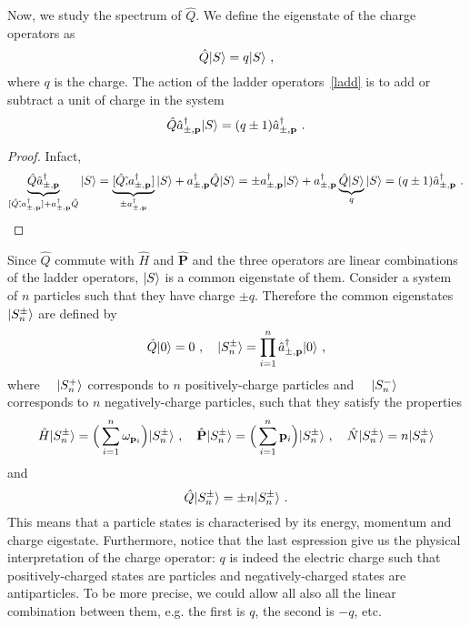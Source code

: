     Now, we study the spectrum of $\hat Q$. We define the eigenstate of the charge operators as 
    \begin{equation*}
        \hat Q \vert S\rangle = q \vert S\rangle ~,
    \end{equation*}
    where $q$ is the charge. The action of the ladder operators~\eqref{ladd} is to add or subtract a unit of charge in the system
    \begin{equation*}
        \hat Q \hat a_{\pm, \mathbf p}^\dagger \vert S\rangle = (q \pm 1) \hat a_{\pm, \mathbf p}^\dagger ~.
    \end{equation*}
    \begin{proof}
        Infact, 
        \begin{equation*}
            \underbrace{\hat Q \hat a_{\pm, \mathbf p}^\dagger}_{[\hat Q \hat,  a_{\pm, \mathbf p}^\dagger] + a_{\pm, \mathbf p}^\dagger \hat Q } \vert S\rangle = \underbrace{[\hat Q \hat,  a_{\pm, \mathbf p}^\dagger]}_{\pm a_{\pm, \mathbf p}^\dagger} \vert S\rangle + a_{\pm, \mathbf p}^\dagger \hat Q \vert S\rangle = \pm a_{\pm, \mathbf p}^\dagger \vert S\rangle + a_{\pm, \mathbf p}^\dagger \underbrace{\hat Q \vert S\rangle}_{q }\vert S\rangle = (q \pm 1) \hat a_{\pm, \mathbf p}^\dagger ~.
        \end{equation*}
    \end{proof}

    Since $\hat Q$ commute with $\hat H$ and $\hat{\mathbf P}$ and the three operators are linear combinations of the ladder operators, $\vert S\rangle$ is a common eigenstate of them. Consider a system of $n$ particles such that they have charge $\pm q$. Therefore the common eigenstates $\vert S_n^\pm\rangle$ are defined by 
    \begin{equation*}
        \hat Q \vert0\rangle = 0 ~, \quad \vert S_n^\pm\rangle = \prod_{i=1}^n \hat a_{\pm, \mathbf p}^\dagger \vert0\rangle ~,
    \end{equation*}
    where $\quad \vert S_n^+\rangle$ corresponds to $n$ positively-charge particles and $\quad \vert S_n^-\rangle$ corresponds to $n$ negatively-charge particles, such that they satisfy the properties
    \begin{equation*}
        \hat H \vert S_n^\pm\rangle = \Big (\sum_{i = 1}^{n} \omega_{\mathbf p_i} \Big ) \vert S_n^\pm\rangle ~, \quad \hat{\mathbf P} \vert S_n^\pm\rangle = \Big (\sum_{i = 1}^{n} \mathbf p_i \Big ) \vert S_n^\pm\rangle ~, \quad \hat N \vert S_n^\pm\rangle = n \vert S_n^\pm\rangle
    \end{equation*}
    and 
    \begin{equation*}
        \hat Q \vert S_n^\pm\rangle = \pm n \vert S_n^\pm\rangle ~.
    \end{equation*}
    This means that a particle states is characterised by its energy, momentum and charge eigestate. Furthermore, notice that the last espression give us the physical interpretation of the charge operator: $q$ is indeed the electric charge such that positively-charged states are particles and negatively-charged states are antiparticles. To be more precise, we could allow all also all the linear combination between them, e.g. the first is $q$, the second is $-q$, etc.

